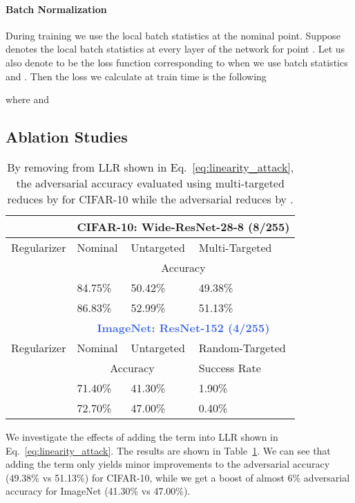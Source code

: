 \documentclass{article}
\theoremstyle{plain}
\theoremstyle{definition}
\theoremstyle{remark}
\begin{document}
\paragraph{Batch Normalization}During training we use the local batch statistics at the nominal point. Suppose  denotes the local batch statistics at every layer of the network for point . Let us also denote  to be the loss function corresponding to when we use batch statistics  and . Then the loss we calculate at train time is the following

where  and 

\subsection{Ablation Studies}\label{sec:ablation}
\begin{table}[htb]
\centering
\begin{tabular}{ p{3.8cm}||p{2.3cm}|p{2.3cm}|p{2.7cm}}
 &\multicolumn{3}{c}{{\bf\textcolor{Mahogany}{CIFAR-10: Wide-ResNet-28-8 (8/255)}}} \\
 \hline
 Regularizer& Nominal & Untargeted  & Multi-Targeted\\
 \hline
 & \multicolumn{3}{c}{Accuracy}\\\hline
   & 84.75\%&  50.42\%&  49.38\%  \\
   & 86.83\% &  52.99\% &  51.13\%\\
 \hline
 &\multicolumn{3}{c}{{\bf \textcolor{RoyalBlue}{ImageNet: ResNet-152 (4/255)}}} \\\hline
 Regularizer& Nominal  &Untargeted &Random-Targeted\\
 \hline
 & \multicolumn{2}{c|}{Accuracy} & Success Rate \\\hline
    & 71.40\%&  41.30\%&    1.90\% \\
  & 72.70\% &  47.00\% & 0.40\%\\
\end{tabular}
\caption{By removing  from LLR shown in Eq.~\eqref{eq:linearity_attack}, the adversarial accuracy evaluated using multi-targeted reduces by  for CIFAR-10 while the adversarial reduces by .}\label{tab:ablation}
\end{table}

We investigate the effects of adding the term  into LLR shown in Eq.~\eqref{eq:linearity_attack}. The results are shown in Table~\ref{tab:ablation}. We can see that adding the term  only yields minor improvements to the adversarial accuracy (49.38\% vs 51.13\%) for CIFAR-10, while we get a boost of almost 6\% adversarial accuracy for ImageNet (41.30\% vs 47.00\%).
\end{document}
